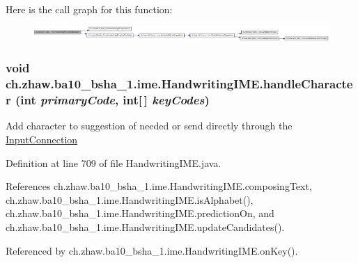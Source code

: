 Here is the call graph for this function:\nopagebreak
\begin{figure}[H]
\begin{center}
\leavevmode
\includegraphics[width=420pt]{classch_1_1zhaw_1_1ba10__bsha__1_1_1ime_1_1HandwritingIME_a629b38e45bc795d46cb7ce1c79bc1def_cgraph}
\end{center}
\end{figure}
\hypertarget{classch_1_1zhaw_1_1ba10__bsha__1_1_1ime_1_1HandwritingIME_a5b7f7f06b8e6f5eb9797725b5d814f5c}{
\subsubsection[{handleCharacter}]{\setlength{\rightskip}{0pt plus 5cm}void ch.zhaw.ba10\_\-bsha\_\-1.ime.HandwritingIME.handleCharacter (int {\em primaryCode}, \/  int\mbox{[}$\,$\mbox{]} {\em keyCodes})}}
\label{classch_1_1zhaw_1_1ba10__bsha__1_1_1ime_1_1HandwritingIME_a5b7f7f06b8e6f5eb9797725b5d814f5c}
Add character to suggestion of needed or send directly through the \hyperlink{}{InputConnection} 

Definition at line 709 of file HandwritingIME.java.

References ch.zhaw.ba10\_\-bsha\_\-1.ime.HandwritingIME.composingText, ch.zhaw.ba10\_\-bsha\_\-1.ime.HandwritingIME.isAlphabet(), ch.zhaw.ba10\_\-bsha\_\-1.ime.HandwritingIME.predictionOn, and ch.zhaw.ba10\_\-bsha\_\-1.ime.HandwritingIME.updateCandidates().

Referenced by ch.zhaw.ba10\_\-bsha\_\-1.ime.HandwritingIME.onKey().

